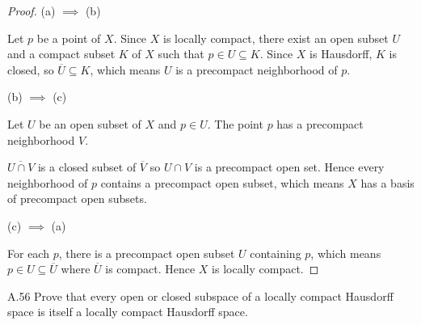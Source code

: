 \begin{proof}
    (a) \( \implies \) (b)

    Let \( p \) be a point of \( X \). Since \( X \) is locally compact, there exist an open subset \( U \) and a compact subset \( K \) of \( X \) such that \( p \in U \subseteq K \). Since \( X \) is Hausdorff, \( K \) is closed, so \( \overline{U} \subseteq K \), which means \( U \) is a precompact neighborhood of \( p \).

    (b) \( \implies \) (c)

    Let \( U \) be an open subset of \( X \) and \( p \in U \). The point \( p \) has a precompact neighborhood \( V \).

    \( \overline{U \cap V} \) is a closed subset of \( \overline{V} \) so \( U \cap V \) is a precompact open set. Hence every neighborhood of \( p \) contains a precompact open subset, which means \( X \) has a basis of precompact open subsets.

    (c) \( \implies \) (a)

    For each \( p \), there is a precompact open subset \( U \) containing \( p \), which means \( p \in U \subseteq \overline{U} \) where \( \overline{U} \) is compact. Hence \( X \) is locally compact.
\end{proof}

\begin{exercise}{A.56}
    Prove that every open or closed subspace of a locally compact Hausdorff space is itself a locally compact Hausdorff space.
\end{exercise}

